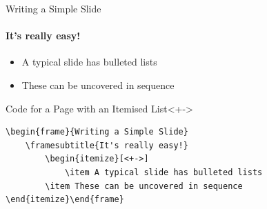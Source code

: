 \begin{frame}[fragile]{Writing a Simple Slide}
\framesubtitle{It's really easy!}
\begin{itemize}[<+->]
    \item A typical slide has bulleted lists
    \item These can be uncovered in sequence
\end{itemize}
\begin{block}{Code for a Page with an Itemised List}<+->
\begin{verbatim}
\begin{frame}{Writing a Simple Slide}
    \framesubtitle{It's really easy!}
        \begin{itemize}[<+->]
            \item A typical slide has bulleted lists
        \item These can be uncovered in sequence
\end{itemize}\end{frame}
\end{verbatim}
\end{block}
\end{frame}


